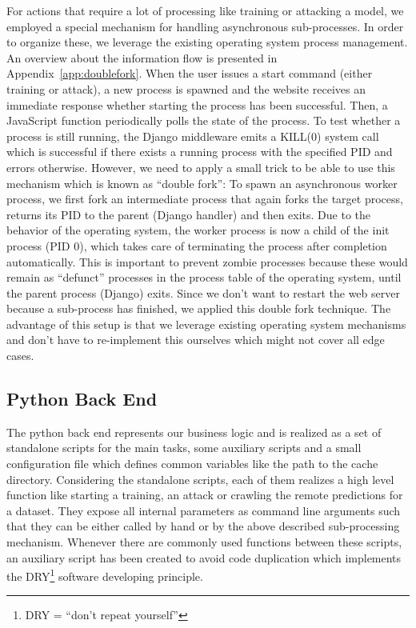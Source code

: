 For actions that require a lot of processing like training or attacking a model, we employed a special mechanism for handling asynchronous sub-processes.
In order to organize these, we leverage the existing operating system process management.
An overview about the information flow is presented in Appendix~\ref{app:doublefork}.
When the user issues a start command (either training or attack), a new process is spawned and the website receives an immediate response whether starting the process has been successful.
Then, a JavaScript function periodically polls the state of the process.
To test whether a process is still running, the Django middleware emits a KILL(0) system call which is successful if there exists a running process with the specified PID and errors otherwise.
However, we need to apply a small trick to be able to use this mechanism which is known as \enquote{double fork}: To spawn an asynchronous worker process, we first fork an intermediate process that again forks the target process, returns its PID to the parent (Django handler) and then exits.
Due to the behavior of the operating system, the worker process is now a child of the init process (PID 0), which takes care of terminating the process after completion automatically.
This is important to prevent zombie processes because these would remain as \enquote{defunct} processes in the process table of the operating system, until the parent process (Django) exits.
Since we don't want to restart the web server because a sub-process has finished, we applied this double fork technique.
The advantage of this setup is that we leverage existing operating system mechanisms and don't have to re-implement this ourselves which might not cover all edge cases.

\subsection{Python Back End}\label{subsec:backend}
The python back end represents our business logic and is realized as a set of standalone scripts for the main tasks, some auxiliary scripts and a small configuration file which defines common variables like the path to the cache directory.
Considering the standalone scripts, each of them realizes a high level function like starting a training, an attack or crawling the remote predictions for a dataset.
They expose all internal parameters as command line arguments such that they can be either called by hand or by the above described sub-processing mechanism.
Whenever there are commonly used functions between these scripts, an auxiliary script has been created to avoid code duplication which implements the DRY\footnote{DRY = \enquote{don't repeat yourself}} software developing principle.

